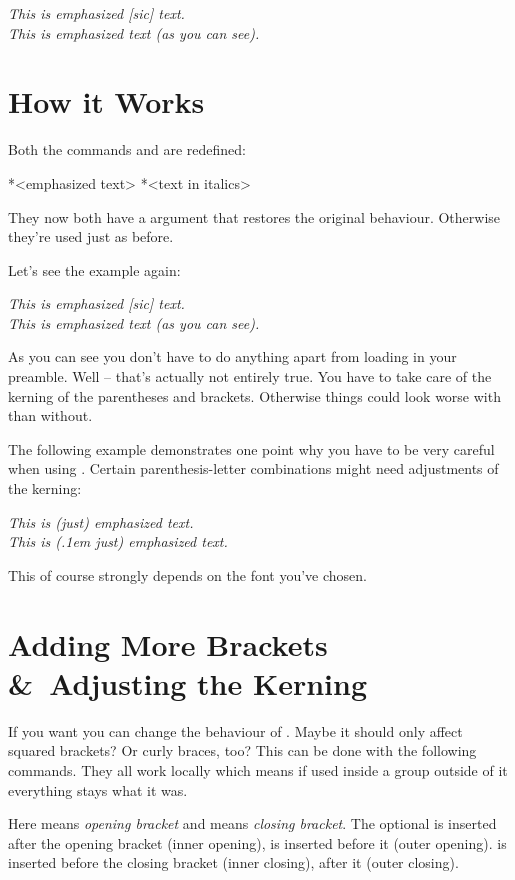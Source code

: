 \documentclass[DIV10,toc=index,toc=bib]{cnpkgdoc}
\begin{document}
\begin{beispiel}
 \emph{This is emphasized [sic] text.} \\
 \emph{This is emphasized text (as you can see).}
\end{beispiel}

\section{How it Works}
Both the commands  and  are redefined:
\begin{beschreibung}
 *{<emphasized text>}
 *{<text in italics>}
\end{beschreibung}
They now both have a \code{*} argument that restores the original behaviour.
Otherwise they're used just as before.

Let's see the example again:
\begin{beispiel}
 \emph{This is emphasized [sic] text.} \\
 \emph{This is emphasized text (as you can see).}
\end{beispiel}
As you can see you don't have to do anything apart from loading \embrac in your
preamble. Well -- that's actually not entirely true. You have to take care of the
kerning of the parentheses and brackets. Otherwise things could look worse with
\embrac than without.

The following example demonstrates one point why you have to be very careful
when using \embrac. Certain parenthesis-letter combinations might need adjustments
of the kerning:
\begin{beispiel}
 \emph{This is (just) emphasized text.} \\
 \emph{This is (\kern.1em just) emphasized text.}
\end{beispiel}
This of course strongly depends on the font you've chosen.

\section{Adding More Brackets \&\ Adjusting the Kerning}
If you want you can change the behaviour of \embrac. Maybe it should only affect
squared brackets? Or curly braces, too? This can be done with the following
commands. They all work locally which means if used inside a group outside of it
everything stays what it was.
\begin{beschreibung}
\end{beschreibung}
Here  means \emph{opening bracket} and  means \emph{closing
bracket}. The optional  is inserted after the opening bracket
(inner opening),  is inserted before it (outer opening).
 is inserted before the closing bracket (inner closing),
 after it (outer closing).
\end{document}
